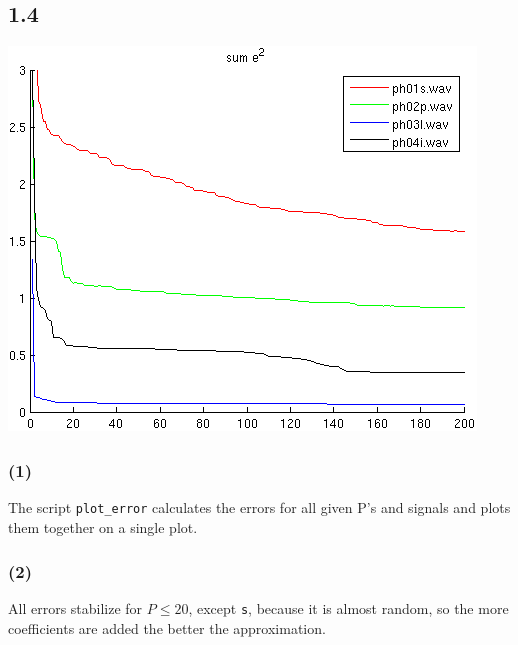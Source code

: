 \documentclass[a4paper]{article}
\newcommand{\TT}[1] {\texttt{#1}}
\begin{document}
\subsection*{1.4}

\includegraphics[scale=1]{error2.png}

\subsubsection*{(1)}

The script \TT{plot\_error} calculates the errors for all given P's and signals
and plots them together on a single plot.

\subsubsection*{(2)}

All errors stabilize for $ P \le 20 $, except \TT{s}, because it is almost
random, so the more coefficients are added the better the approximation.
\end{document}

